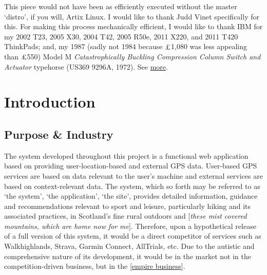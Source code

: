 \documentclass[11pt, english]{article}
\begin{document}
This piece would not have been as efficiently executed without the master `distro’, if you will, Artix Linux. I would like to thank Judd Vinet specifically for this. For making this process mechanically efficient, I would like to thank IBM for my 2002 T23, 2005 X30, 2004 T42, 2005 R50e, 2011 X220, and 2011 T420 ThinkPads; and, my 1987 (sadly not 1984 because $\textrm{\pounds}$1,080 was less appealing than $\textrm{\pounds}$550) Model M \textit{Catastrophically Buckling Compression Column Switch and Actuator} typehorse (US369 9296A, 1972). See \href{http://lewisbritton.com/Blog/ThinkFlow.html}{more}. 

\newpage

	\renewcommand{\contentsname}{Table of Contents}

	\tableofcontents

\newpage

	\listoftables

\newpage

	\listoffigures

\newpage


\section{Introduction}\label{ch1}

	\subsection{Purpose \& Industry}

	The system developed throughout this project is a functional web application based on providing user-location-based and external GPS data. User-based GPS services are based on data relevant to the user's machine and external services are based on context-relevant data. The system, which so forth may be referred to as `the system', `the application', `the site', provides detailed information, guidance and recommendations relevant to sport and leisure, particularly hiking and its associated practices, in Scotland's fine rural outdoors and [\textit{these mist covered mountains, which are home now for me}]. Therefore, upon a hypothetical release of a full version of this system, it would be a direct competitor of services such as Walkhighlands, Strava, Garmin Connect, AllTrials, etc. Due to the autistic and comprehensive nature of its development, it would be in the market not in the competition-driven business, but in the [\href{https://youtu.be/c18_Thy6kJo?t=204}{empire business}].
\end{document}
